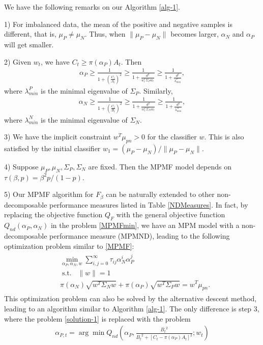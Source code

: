 \documentclass[15pt]{article}
\newcommand{\ben}{\begin{eqnarray*}}
\newcommand{\enn}{\end{eqnarray*}}
\begin{document}
We have the following remarks on our Algorithm \ref{alg-1}.

1) For imbalanced data, the mean of the positive and negative samples is different, 
that is, $\mu_P\neq\mu_N$. Thus, when $\|\mu_P-\mu_N\|$ becomes larger, $\alpha_N$ and $\alpha_P$ 
will get smaller.

2) Given $w_t$, we have $C_t\ge\pi(\alpha_P)A_t$. Then
\ben
\alpha_P\ge\frac{1}{1+\left(\frac{C_t}{A_t}\right)^2}\ge\frac{1}{1+\frac{d^2}{w_t^T \Sigma_P w_t}}
\ge\frac{1}{1+\frac{d^2}{\lambda_{min}^{P}}},
\enn
where $\lambda_{min}^{P}$ is the minimal eigenvalue of $\Sigma_P$.
Similarly, 
\ben
\alpha_N\ge\frac{1}{1+\left(\frac{C_t}{B_t}\right)^2}\ge\frac{1}{1+\frac{d^2}{w_t^T \Sigma_N w_t}}
\ge\frac{1}{1+\frac{d^2}{\lambda_{min}^{N}}},
\enn
where $\lambda_{min}^{N}$ is the minimal eigenvalue of $\Sigma_N$.

3) We have the implicit constraint $w^T\mu_{pn}>0$ for the classifier $w$. This is also satisfied by
the initial classifier $w_1=({\mu_P-\mu_N})/{\|\mu_P-\mu_N\|}$.

4) Suppose $\mu_P,\mu_N,\Sigma_P,\Sigma_N$ are fixed. Then the MPMF model depends on
$\tau(\beta,p)={\beta^2p}/({1-p})$.

5) Our MPMF algorithm for $F_\beta$ can be naturally extended to other non-decomposable performance
measures listed in Table \ref{NDMeasures}. In fact, by replacing the objective function $Q_{F}$ with
the general objective function $Q_{nd}(\alpha_P,\alpha_N)$ in the problem \eqref{MPMFmin},
we have an MPM model with a non-decomposable performance measure (MPMND), leading to
the following optimization problem similar to \eqref{MPMF}:
\begin{align}\label{MPMND}
\begin{split}
&\min_{\alpha_P,\alpha_N, w} \sum_{i,j=0}^ \infty \tau_{ij} \alpha_N^i \alpha_P^j \\
&\;\text{s.t.}\;\;\;\|w\|=1  \\
& \pi(\alpha_N)\sqrt{w^T\Sigma_N w}+\pi(\alpha_P)\sqrt{w^T\Sigma_P w}= w^T\mu_{pn}.
\end{split}
\end{align}
This optimization problem can also be solved by the alternative descent method, leading to an algorithm
similar to Algorithm \ref{alg-1}. The only difference is step 3, where the problem \eqref{solution-1}
is replaced with the problem
\ben
\alpha_{P,t}=\arg\min Q_{nd}\left(\alpha_P,\frac{{B_t}^2}{{B_t}^2+[C_t-\pi(\alpha_P)A_t]^2};w_t\right)
\enn
\end{document}
